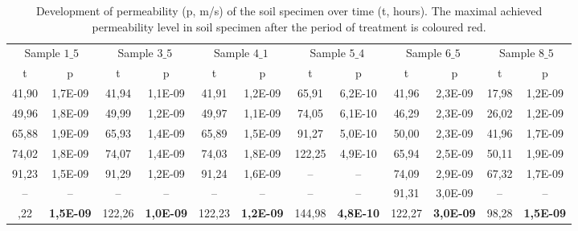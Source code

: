 \documentclass[algorithms,article,submit,pdftex,moreauthors]{Definitions/mdpi}
\begin{document}
\begin{table}[H] 
\caption{Development of permeability (p, m/s) of the soil specimen over time (t, hours). The maximal achieved permeability level in soil specimen after the period of treatment is coloured red.\label{tab02}}
\renewcommand{\arraystretch}{1.1}
\begin{adjustbox}{width=1\textwidth}
\begin{tabular}{cc|cc|cc|cc|cc|cc}
\toprule
\multicolumn{2}{c}{Sample $1\_5$} & \multicolumn{2}{c}{Sample $3\_5$} & \multicolumn{2}{c}{Sample $4\_1$} & \multicolumn{2}{c}{Sample $5\_4$} & \multicolumn{2}{c}{Sample $6\_5$} & \multicolumn{2}{c}{Sample $8\_5$}\\
\cmidrule(lr){1-2}\cmidrule(lr){3-4}\cmidrule(lr){5-6}\cmidrule(lr){7-8}\cmidrule(lr){9-10}\cmidrule(lr){11-12}
t & p & t & p & t & p & t & p & t & p & t & p\\
\midrule
41,90 &1,7E-09 & 41,94 &1,1E-09 & 41,91 & 1,2E-09 & 65,91 & 6,2E-10 & 41,96 & 2,3E-09 & 17,98 & 1,2E-09 \\
49,96 &1,8E-09 & 49,99 &1,2E-09 & 49,97 & 1,1E-09 & 74,05 & 6,1E-10 & 46,29 & 2,3E-09 & 26,02 & 1,2E-09 \\
65,88 &1,9E-09 & 65,93 &1,4E-09 & 65,89 & 1,5E-09 & 91,27 & 5,0E-10 & 50,00 & 2,3E-09 & 41,96 & 1,7E-09 \\
74,02 &1,8E-09 & 74,07 &1,4E-09 & 74,03 & 1,8E-09 & 122,25 & 4,9E-10 & 65,94 & 2,5E-09 & 50,11 & 1,9E-09 \\
91,23 &1,5E-09 & 91,29 &1,2E-09 & 91,24 & 1,6E-09 & -- &-- & 74,09 & 2,9E-09 & 67,32 & 1,7E-09 \\
-- &-- & -- & -- & -- & -- & -- &-- & 91,31 & 3,0E-09 & -- & --\\ \addlinespace
\hline
122,22 & \textbf{1,5E-09} & 122,26 & \textbf{1,0E-09} &122,23 & \textbf{1,2E-09} & 144,98 & \textbf{4,8E-10} & 122,27 & \textbf{3,0E-09} & 98,28 & \textbf{1,5E-09}\\
\bottomrule
\end{tabular}
\end{adjustbox}
\end{table}
\end{document}
